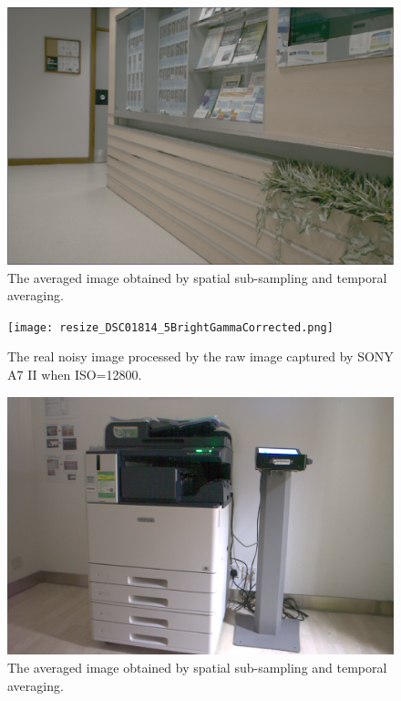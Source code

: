 \documentclass[10pt,twocolumn,letterpaper]{article}
\begin{document}
\begin{figure}
\centering
\includegraphics[width=0.8\linewidth]{STA.png}
\caption{The averaged image obtained by spatial sub-sampling and temporal averaging.
}
\label{f3}
\end{figure}


\begin{figure}
\centering
\texttt{[image: resize\_DSC01814\_5BrightGammaCorrected.png]}
\vspace{-4mm}
\caption{The real noisy image processed by the raw image captured by SONY A7 II when ISO=12800.
}
\label{f4}
\end{figure}


\begin{figure}
\centering
\includegraphics[width=0.8\linewidth]{SONY_A7II_ISO12800_A_5BrightGammaCorrected.png}
\vspace{-4mm}
\caption{The averaged image obtained by spatial sub-sampling and temporal averaging.
}
\label{f5}
\end{figure}


{
\small


}
\end{document}
